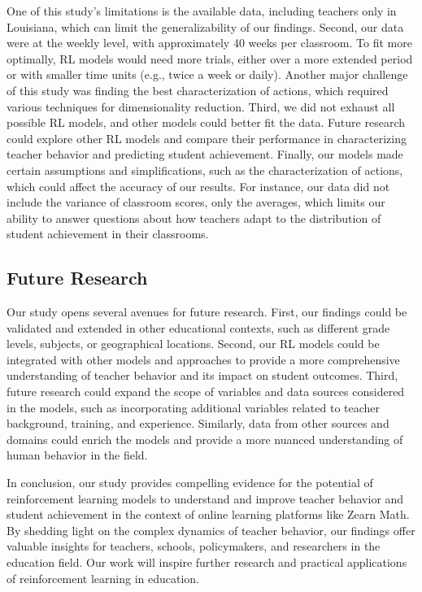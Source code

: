\documentclass[
  number,
  preprint,
  3p,
  onecolumn]{elsarticle}
\begin{document}
One of this study's limitations is the available data, including
teachers only in Louisiana, which can limit the generalizability of our
findings. Second, our data were at the weekly level, with approximately
40 weeks per classroom. To fit more optimally, RL models would need more
trials, either over a more extended period or with smaller time units
(e.g., twice a week or daily). Another major challenge of this study was
finding the best characterization of actions, which required various
techniques for dimensionality reduction. Third, we did not exhaust all
possible RL models, and other models could better fit the data. Future
research could explore other RL models and compare their performance in
characterizing teacher behavior and predicting student achievement.
Finally, our models made certain assumptions and simplifications, such
as the characterization of actions, which could affect the accuracy of
our results. For instance, our data did not include the variance of
classroom scores, only the averages, which limits our ability to answer
questions about how teachers adapt to the distribution of student
achievement in their classrooms.

\hypertarget{future-research}{%
\subsection{Future Research}\label{future-research}}

Our study opens several avenues for future research. First, our findings
could be validated and extended in other educational contexts, such as
different grade levels, subjects, or geographical locations. Second, our
RL models could be integrated with other models and approaches to
provide a more comprehensive understanding of teacher behavior and its
impact on student outcomes. Third, future research could expand the
scope of variables and data sources considered in the models, such as
incorporating additional variables related to teacher background,
training, and experience. Similarly, data from other sources and domains
could enrich the models and provide a more nuanced understanding of
human behavior in the field.

In conclusion, our study provides compelling evidence for the potential
of reinforcement learning models to understand and improve teacher
behavior and student achievement in the context of online learning
platforms like Zearn Math. By shedding light on the complex dynamics of
teacher behavior, our findings offer valuable insights for teachers,
schools, policymakers, and researchers in the education field. Our work
will inspire further research and practical applications of
reinforcement learning in education.
\end{document}
